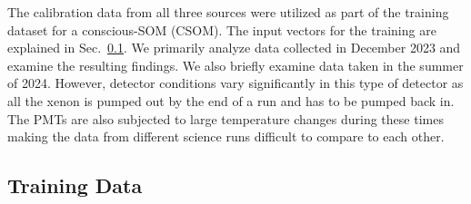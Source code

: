 The calibration data from all three sources were utilized as part of the training dataset for a conscious-SOM (CSOM). The input vectors for the training are explained in Sec.~\ref{sec:training_data}. We primarily analyze data collected in December 2023 and examine the resulting findings. We also briefly examine data taken in the summer of 2024. However, detector conditions vary significantly in this type of detector as all the xenon is pumped out by the end of a run and has to be pumped back in. The PMTs are also subjected to large temperature changes during these times making the data from different science runs difficult to compare to each other.


\subsection{Training Data}
\label{sec:training_data}

